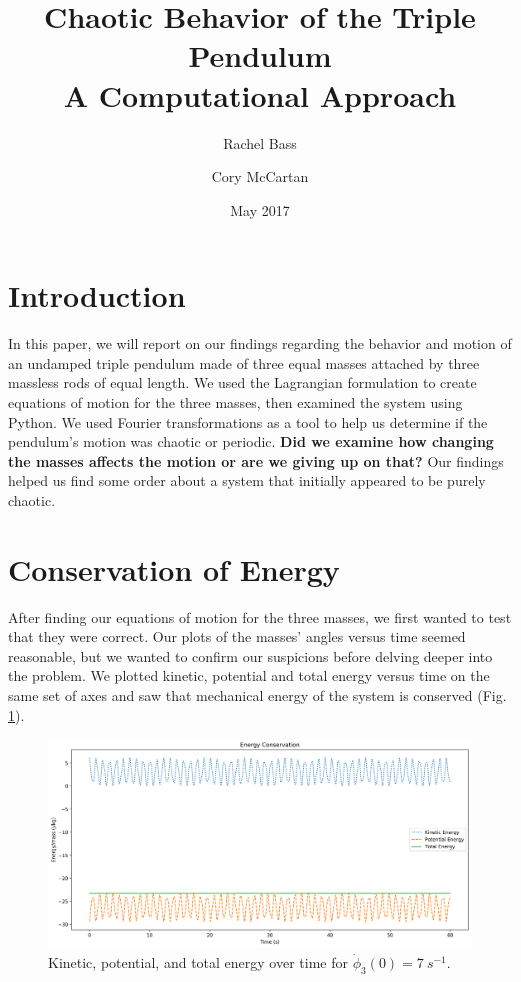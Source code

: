 \documentclass{article}
\title{Chaotic Behavior of the Triple Pendulum \\
    \large A Computational Approach }
\author{Rachel Bass \and Cory McCartan}
\date{May 2017}
\begin{document}
\maketitle

\section{Introduction}
In this paper, we will report on our findings regarding the behavior and
motion of an undamped triple pendulum made of three equal masses attached by
three massless rods of equal length. We used the Lagrangian formulation to
create equations of motion for the three masses, then examined the system using
Python. We used Fourier transformations as a tool to help us determine if the
pendulum's motion was chaotic or periodic. \textbf{Did we examine how changing
the masses affects the motion or are we giving up on that?} Our findings helped
us find some order about a system that initially appeared to be purely chaotic.
    
\section{Conservation of Energy}
After finding our equations of motion for the three masses, we first wanted to
test that they were correct. Our plots of the masses' angles versus time seemed
reasonable, but we wanted to confirm our suspicions before delving deeper into
the problem. We plotted kinetic, potential and total energy versus time on the
same set of axes and saw that mechanical energy of the system is conserved
(Fig. \ref{fig:energy_cons}).
\begin{figure}[h]
	\centering
	\includegraphics[width=\textwidth]{energy_conservation}
	\caption{Kinetic, potential, and total energy over time for $\dot\phi_3(0)=\SI{7}{s^{-1}}$.}
	\label{fig:energy_cons}
\end{figure}
\end{document}

